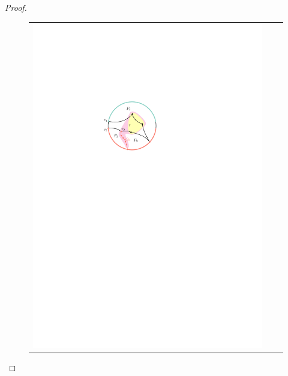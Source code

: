 \documentclass{patmorin}
\theoremstyle{plain}
\theoremstyle{definition}
\begin{document}
\begin{proof}
\begin{figure}
\begin{center}
\begin{tabular}{c@{}c@{}c}
				\includegraphics{figs/zoomba-2} &

\end{tabular}
\end{center}
\end{figure}
\end{proof}
\end{document}
